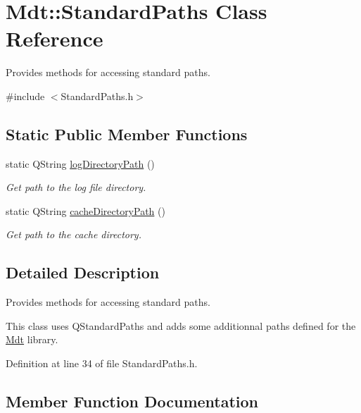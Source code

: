 \hypertarget{class_mdt_1_1_standard_paths}{}\section{Mdt\+:\+:Standard\+Paths Class Reference}
\label{class_mdt_1_1_standard_paths}


Provides methods for accessing standard paths.  




{\ttfamily \#include $<$Standard\+Paths.\+h$>$}

\subsection*{Static Public Member Functions}
\begin{DoxyCompactItemize}
\item 
static Q\+String \hyperlink{class_mdt_1_1_standard_paths_aa45caeb4d2b4a5c539d301d800a7deac}{log\+Directory\+Path} ()
\begin{DoxyCompactList}\small\item\em Get path to the log file directory. \end{DoxyCompactList}\item 
static Q\+String \hyperlink{class_mdt_1_1_standard_paths_a2ca803e5a6b9fb2a4808968becfb86de}{cache\+Directory\+Path} ()
\begin{DoxyCompactList}\small\item\em Get path to the cache directory. \end{DoxyCompactList}\end{DoxyCompactItemize}


\subsection{Detailed Description}
Provides methods for accessing standard paths. 

This class uses Q\+Standard\+Paths and adds some additionnal paths defined for the \hyperlink{namespace_mdt}{Mdt} library. 

Definition at line 34 of file Standard\+Paths.\+h.



\subsection{Member Function Documentation}
